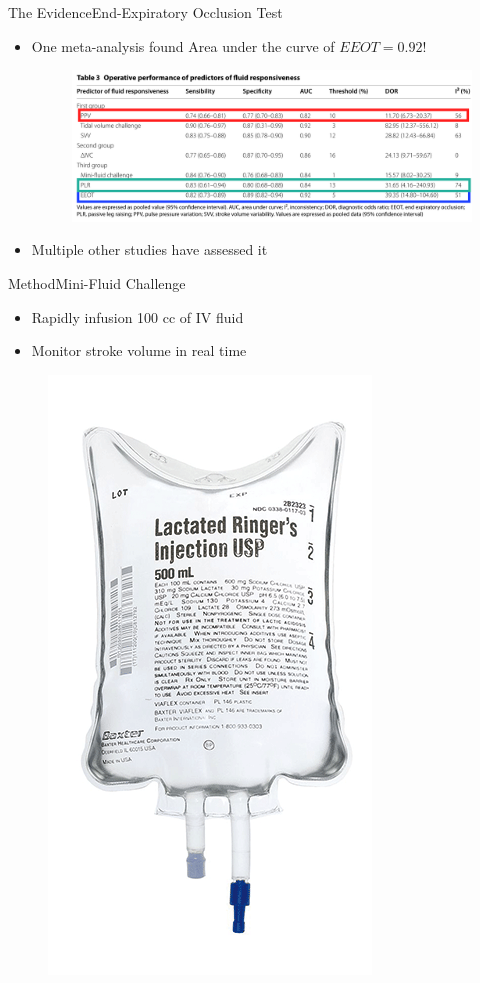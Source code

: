 \documentclass{beamer}
\begin{document}
			\begin{frame}{The Evidence}{End-Expiratory Occlusion Test}
				\begin{itemize}
					\item One meta-analysis found Area under the curve of $EEOT=0.92$!\cite{AlvaradoSanchez2021}
					\begin{figure}
						\centering
						\includegraphics[width=0.9\linewidth]{figures/responsivenessMethodsCompared-3}
						\label{fig:responsivenessmethodscompared-3}
					\end{figure}
					\item Multiple other studies have assessed it \cite{Gavelli2019}
				\end{itemize}
			\end{frame}
			\begin{frame}{Method}{Mini-Fluid Challenge}
				\begin{itemize}
					\item Rapidly infusion 100 cc of IV fluid
					\item Monitor stroke volume in real time
				\end{itemize}
				\begin{figure}
					\centering
					\includegraphics[height=0.7\textheight]{figures/lr}
					\caption{}
					\label{fig:lr}
				\end{figure}
			\end{frame}
\end{document}
